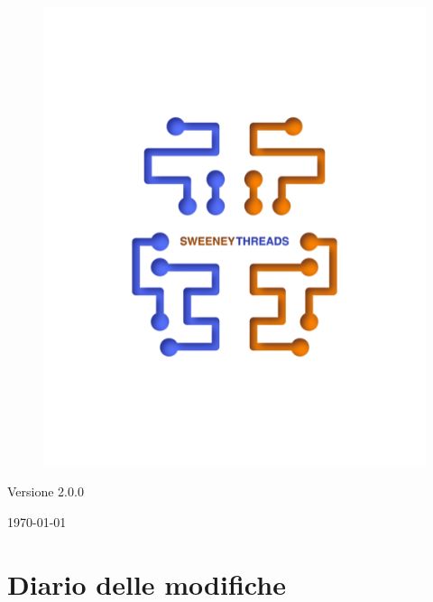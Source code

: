 \documentclass[a4paper]{article}
\begin{document}
\begin{titlepage}
		\begin{figure}[H]
			\centering
			\includegraphics[scale=0.8]{../sweeney.png}
		\end{figure}
		\begin{center}
			Versione 2.0.0
		\end{center}
		{\large \today}\\[3cm] 
		\vfill  
	\end{titlepage}
	
	\tableofcontents
	
	\newpage 
	\section*{Diario delle modifiche}
	
\end{document}
